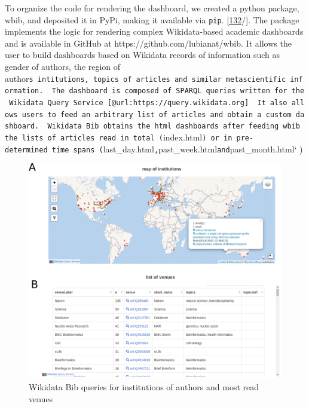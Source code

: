 To organize the code for rendering the dashboard, we created a python package, wbib, and deposited it in PyPi, making it available via \texttt{pip}. {[}\protect\hyperlink{ref-6chnW6cc}{132}/{]}.
The package implements the logic for rendering complex Wikidata-based academic dashboards and is available in GitHub at https://github.com/lubianat/wbib.
It allows the user to build dashboards based on Wikidata records of information such as gender of authors, the region of author\texttt{s\ intitutions,\ topics\ of\ articles\ and\ similar\ metascientific\ information.\ \ The\ dashboard\ is\ composed\ of\ SPARQL\ queries\ written\ for\ the\ Wikidata\ Query\ Service\ {[}@url:https://query.wikidata.org{]}\ \ It\ also\ allows\ users\ to\ feed\ an\ arbitrary\ list\ of\ articles\ and\ obtain\ a\ custom\ dashboard.\ \ Wikidata\ Bib\ obtains\ the\ html\ dashboards\ after\ feeding\ wbib\ the\ lists\ of\ articles\ read\ in\ total\ (}index.html\texttt{)\ or\ in\ pre-determined\ time\ spans\ (}last\_day.html\texttt{,}past\_week.html\texttt{and}past\_month.html` )

\begin{figure}
\hypertarget{fig:dashboard}{%
\centering
\includegraphics{images/wikidata_bib_display.png}
\caption{Wikidata Bib queries for institutions of authors and most read venues}\label{fig:dashboard}
}
\end{figure}

